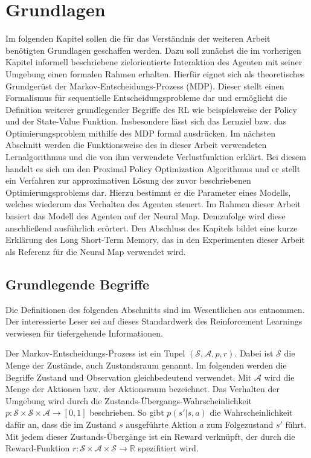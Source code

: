 \chapter{Grundlagen}
\label{chap_basics}

Im folgenden Kapitel sollen die für das Verständnis der weiteren Arbeit benötigten Grundlagen geschaffen werden. Dazu soll zunächst die im vorherigen Kapitel informell beschriebene zielorientierte Interaktion des Agenten mit seiner Umgebung einen formalen Rahmen erhalten. Hierfür eignet sich als theoretisches Grundgerüst der Markov-Entscheidungs-Prozess (MDP). Dieser stellt einen Formalismus für sequentielle Entscheidungsprobleme dar und ermöglicht die Definition weiterer grundlegender Begriffe des RL wie beispielsweise der Policy und der State-Value Funktion. Insbesondere lässt sich das Lernziel bzw. das Optimierungsproblem mithilfe des MDP formal ausdrücken. Im nächsten Abschnitt werden die Funktionsweise des in dieser Arbeit verwendeten Lernalgorithmus und die von ihm verwendete Verlustfunktion erklärt. Bei diesem handelt es sich um den Proximal Policy Optimization Algorithmus und er stellt ein Verfahren zur approximativen Lösung des zuvor beschriebenen Optimierungsproblems dar. Hierzu bestimmt er die Parameter eines Modells, welches wiederum das Verhalten des Agenten steuert. Im Rahmen dieser Arbeit basiert das Modell des Agenten auf der Neural Map. Demzufolge wird diese anschließend ausführlich erörtert. Den Abschluss des Kapitels bildet eine kurze Erklärung des Long Short-Term Memory, das in den Experimenten dieser Arbeit als Referenz für die Neural Map verwendet wird.


\section{Grundlegende Begriffe}
\label{sec_basics}

Die Definitionen des folgenden Abschnitts sind im Wesentlichen aus \cite{SuttonBarto} entnommen. Der interessierte Leser sei auf dieses Standardwerk des Reinforcement Learnings verwiesen für tiefergehende Informationen.

Der Markov-Entscheidungs-Prozess ist ein Tupel $(\mathcal{S, A}, p, r)$. Dabei ist $\mathcal{S}$ die Menge der Zustände, auch Zustandsraum genannt. Im folgenden werden die Begriffe Zustand und Observation gleichbedeutend verwendet. Mit $\mathcal{A}$ wird die Menge der Aktionen bzw. der Aktionsraum bezeichnet. Das Verhalten der Umgebung wird durch die Zustands-Übergangs-Wahrscheinlichkeit $p: \mathcal{S} \times \mathcal{S} \times \mathcal{A} \to [0,1]$ beschrieben. So gibt $p(s'|s,a)$ die Wahrscheinlichkeit dafür an, dass die im Zustand $s$ ausgeführte Aktion $a$  zum Folgezustand $s'$ führt. Mit jedem dieser Zustands-Übergänge ist ein Reward verknüpft, der durch die Reward-Funktion $r: \mathcal{S} \times \mathcal{A} \times \mathcal{S} \to \mathbb{R}$ spezifitiert wird.

